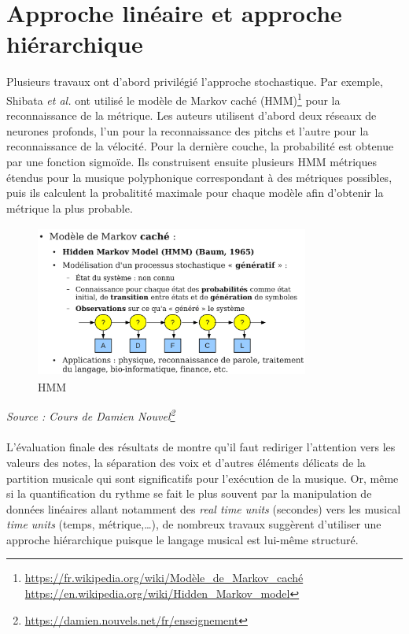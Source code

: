 \section{Approche linéaire et approche hiérarchique}
Plusieurs travaux ont d’abord privilégié l’approche stochastique. Par exemple, Shibata \textit{et al.} \cite{SHIBATA2021262} ont utilisé le modèle de Markov caché (HMM)\footnote{\url{https://fr.wikipedia.org/wiki/Modèle_de_Markov_caché}\\\url{https://en.wikipedia.org/wiki/Hidden_Markov_model}} pour la reconnaissance de la métrique. Les auteurs utilisent d’abord deux réseaux de neurones profonds, l’un pour la reconnaissance des pitchs et l’autre pour la reconnaissance de la vélocité. Pour la dernière couche, la probabilité est obtenue par une fonction sigmoïde. Ils construisent ensuite plusieurs HMM métriques étendus pour la musique polyphonique correspondant à des métriques possibles, puis ils calculent la probalitité maximale pour chaque modèle afin d’obtenir la métrique la plus probable.\newpage
\begin{figure}[h]
	\centering
	\includegraphics[height=50mm, width=90mm]{z_images/2_etat_de_l_art/hmm.png}
	\caption{HMM}
\end{figure}
\textit{Source : Cours de Damien Nouvel\footnote{\url{https://damien.nouvels.net/fr/enseignement}}}\\\\
L’évaluation finale des résultats de \cite{SHIBATA2021262} montre qu’il faut rediriger l’attention vers les valeurs des notes, la séparation des voix et d'autres éléments délicats de la partition musicale qui sont significatifs pour l'exécution de la musique. Or, même si la quantification du rythme se fait le plus souvent par la manipulation de données linéaires allant notamment des \textit{real time units} (secondes) vers les musical \textit{time units} (temps, métrique,…), de nombreux travaux suggèrent d’utiliser une approche hiérarchique puisque le langage musical est lui-même structuré.\\
